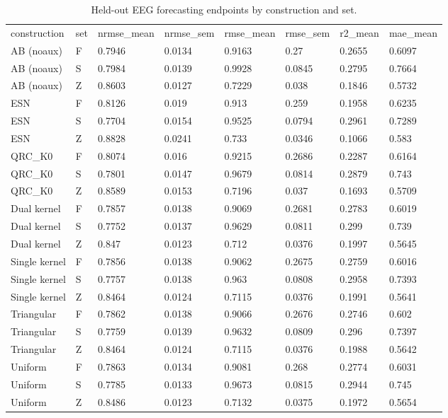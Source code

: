 \begin{table}
\caption{Held-out EEG forecasting endpoints by construction and set.}
\label{tab:eeg_endpoints}
\begin{ruledtabular}
\begin{tabular}{llllllll}
construction & set & nrmse_mean & nrmse_sem & rmse_mean & rmse_sem & r2_mean & mae_mean \\
AB (noaux) & F & 0.7946 & 0.0134 & 0.9163 & 0.27 & 0.2655 & 0.6097 \\
AB (noaux) & S & 0.7984 & 0.0139 & 0.9928 & 0.0845 & 0.2795 & 0.7664 \\
AB (noaux) & Z & 0.8603 & 0.0127 & 0.7229 & 0.038 & 0.1846 & 0.5732 \\
ESN & F & 0.8126 & 0.019 & 0.913 & 0.259 & 0.1958 & 0.6235 \\
ESN & S & 0.7704 & 0.0154 & 0.9525 & 0.0794 & 0.2961 & 0.7289 \\
ESN & Z & 0.8828 & 0.0241 & 0.733 & 0.0346 & 0.1066 & 0.583 \\
QRC_K0 & F & 0.8074 & 0.016 & 0.9215 & 0.2686 & 0.2287 & 0.6164 \\
QRC_K0 & S & 0.7801 & 0.0147 & 0.9679 & 0.0814 & 0.2879 & 0.743 \\
QRC_K0 & Z & 0.8589 & 0.0153 & 0.7196 & 0.037 & 0.1693 & 0.5709 \\
Dual kernel & F & 0.7857 & 0.0138 & 0.9069 & 0.2681 & 0.2783 & 0.6019 \\
Dual kernel & S & 0.7752 & 0.0137 & 0.9629 & 0.0811 & 0.299 & 0.739 \\
Dual kernel & Z & 0.847 & 0.0123 & 0.712 & 0.0376 & 0.1997 & 0.5645 \\
Single kernel & F & 0.7856 & 0.0138 & 0.9062 & 0.2675 & 0.2759 & 0.6016 \\
Single kernel & S & 0.7757 & 0.0138 & 0.963 & 0.0808 & 0.2958 & 0.7393 \\
Single kernel & Z & 0.8464 & 0.0124 & 0.7115 & 0.0376 & 0.1991 & 0.5641 \\
Triangular & F & 0.7862 & 0.0138 & 0.9066 & 0.2676 & 0.2746 & 0.602 \\
Triangular & S & 0.7759 & 0.0139 & 0.9632 & 0.0809 & 0.296 & 0.7397 \\
Triangular & Z & 0.8464 & 0.0124 & 0.7115 & 0.0376 & 0.1988 & 0.5642 \\
Uniform & F & 0.7863 & 0.0134 & 0.9081 & 0.268 & 0.2774 & 0.6031 \\
Uniform & S & 0.7785 & 0.0133 & 0.9673 & 0.0815 & 0.2944 & 0.745 \\
Uniform & Z & 0.8486 & 0.0123 & 0.7132 & 0.0375 & 0.1972 & 0.5654 \\
\end{tabular}
\end{ruledtabular}
\end{table}
